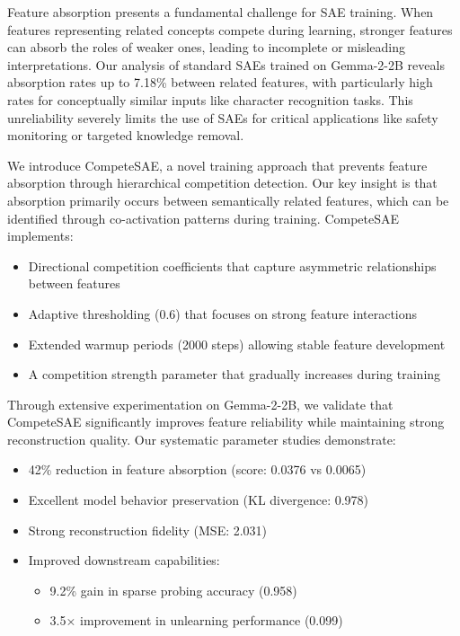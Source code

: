 \documentclass{article} %
\begin{document}
Feature absorption presents a fundamental challenge for SAE training. When features representing related concepts compete during learning, stronger features can absorb the roles of weaker ones, leading to incomplete or misleading interpretations. Our analysis of standard SAEs trained on Gemma-2-2B reveals absorption rates up to 7.18\% between related features, with particularly high rates for conceptually similar inputs like character recognition tasks. This unreliability severely limits the use of SAEs for critical applications like safety monitoring or targeted knowledge removal.

We introduce CompeteSAE, a novel training approach that prevents feature absorption through hierarchical competition detection. Our key insight is that absorption primarily occurs between semantically related features, which can be identified through co-activation patterns during training. CompeteSAE implements:
\begin{itemize}
    \item Directional competition coefficients that capture asymmetric relationships between features
    \item Adaptive thresholding (0.6) that focuses on strong feature interactions
    \item Extended warmup periods (2000 steps) allowing stable feature development
    \item A competition strength parameter that gradually increases during training
\end{itemize}

Through extensive experimentation on Gemma-2-2B, we validate that CompeteSAE significantly improves feature reliability while maintaining strong reconstruction quality. Our systematic parameter studies demonstrate:
\begin{itemize}
    \item 42\% reduction in feature absorption (score: 0.0376 vs 0.0065)
    \item Excellent model behavior preservation (KL divergence: 0.978)
    \item Strong reconstruction fidelity (MSE: 2.031)
    \item Improved downstream capabilities:
    \begin{itemize}
        \item 9.2\% gain in sparse probing accuracy (0.958)
        \item 3.5× improvement in unlearning performance (0.099)
    \end{itemize}
\end{itemize}
\end{document}
